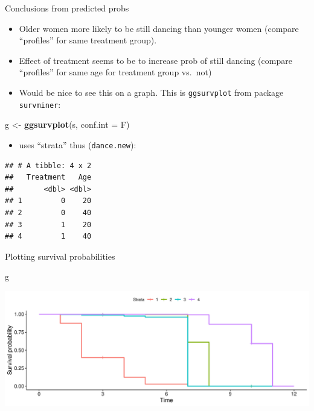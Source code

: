 \documentclass[
  ignorenonframetext,
]{beamer}
\newenvironment{Shaded}{\begin{snugshade}}{\end{snugshade}}
\newcommand{\DataTypeTok}[1]{\textcolor[rgb]{0.13,0.29,0.53}{#1}}
\newcommand{\KeywordTok}[1]{\textcolor[rgb]{0.13,0.29,0.53}{\textbf{#1}}}
\newcommand{\NormalTok}[1]{#1}
\newcommand{\StringTok}[1]{\textcolor[rgb]{0.31,0.60,0.02}{#1}}
\providecommand{\tightlist}{%
  \setlength{\itemsep}{0pt}\setlength{\parskip}{0pt}}
\begin{document}
\begin{frame}[fragile]{Conclusions from predicted probs}
\protect\hypertarget{conclusions-from-predicted-probs}{}

\begin{itemize}
\item
  Older women more likely to be still dancing than younger women
  (compare ``profiles'' for same treatment group).
\item
  Effect of treatment seems to be to increase prob of still dancing
  (compare ``profiles'' for same age for treatment group vs.~not)
\item
  Would be nice to see this on a graph. This is \texttt{ggsurvplot} from
  package \texttt{survminer}:
\end{itemize}

\begin{Shaded}
\begin{Highlighting}[]
\NormalTok{g <-}\StringTok{ }\KeywordTok{ggsurvplot}\NormalTok{(s, }\DataTypeTok{conf.int =}\NormalTok{ F)}
\end{Highlighting}
\end{Shaded}

\begin{itemize}
\tightlist
\item
  uses ``strata'' thus (\texttt{dance.new}):
\end{itemize}

\footnotesize

\begin{verbatim}
## # A tibble: 4 x 2
##   Treatment   Age
##       <dbl> <dbl>
## 1         0    20
## 2         0    40
## 3         1    20
## 4         1    40
\end{verbatim}

\normalsize

\end{frame}

\begin{frame}[fragile]{Plotting survival probabilities}
\protect\hypertarget{plotting-survival-probabilities}{}

\begin{Shaded}
\begin{Highlighting}[]
\NormalTok{g}
\end{Highlighting}
\end{Shaded}

\includegraphics{slides_d29_files/figure-beamer/survival-plot-1.pdf}

\end{frame}
\end{document}
